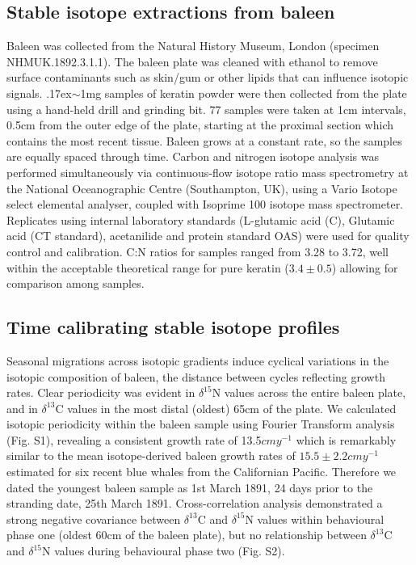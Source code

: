 \documentclass[a4paper,12pt]{article}
\begin{document}
\subsection{Stable isotope extractions from baleen}
Baleen was collected from the Natural History Museum, London (specimen NHMUK.1892.3.1.1). 
The baleen plate was cleaned with ethanol to remove surface contaminants such as skin/gum or other lipids that can influence isotopic signals. 
{\raise.17ex\hbox{$\scriptstyle\sim$}}1mg samples of keratin powder were then collected from the plate using a hand-held drill and grinding bit. 
77%
 samples were taken at 1cm intervals, 0.5cm from the outer edge of the plate, starting at the proximal section which contains the most recent tissue. 
Baleen grows at a constant rate, so the samples are equally spaced through time\cite{best1996stable}. Carbon and nitrogen isotope analysis was performed simultaneously via continuous-flow isotope ratio mass spectrometry at the National Oceanographic Centre (Southampton, UK), using a Vario Isotope select elemental analyser, coupled with Isoprime 100 isotope mass spectrometer. 
Replicates using internal laboratory standards (L-glutamic acid (C), Glutamic acid (CT standard), acetanilide and protein standard OAS) were used for quality control and calibration. 
C:N ratios for samples ranged from 3.28\text{\textperthousand} to 3.72\text{\textperthousand}, well within the acceptable theoretical range for pure keratin ($3.4\pm0.5$) allowing for comparison among samples\cite{hobson1998stable}. 
 
\subsection{Time calibrating stable isotope profiles}
Seasonal migrations across isotopic gradients induce cyclical variations in the isotopic composition of baleen, the distance between cycles reflecting growth rates\cite{hobson1998stable,busquets2017estimating}. 
Clear periodicity was evident in $\delta^{15}$N values across the entire baleen plate, and in $\delta^{13}$C values in the most distal (oldest) 65cm of the plate. 
We calculated isotopic periodicity within the baleen sample using Fourier Transform analysis\cite{cardona2017temporal} (Fig. S1), revealing a consistent growth rate of 13.5$cmy^{-1}$ which is remarkably similar to the mean isotope-derived baleen growth rates of $15.5 \pm 2.2cmy^{-1}$ estimated for six recent blue whales from the Californian Pacific\cite{busquets2017estimating}.  
Therefore we dated the youngest baleen sample as 1st March 1891, 24 days prior to the stranding date, 25th March 1891. 
Cross-correlation analysis demonstrated a strong negative covariance between $\delta^{13}$C and $\delta^{15}$N values within behavioural phase one (oldest 60cm of the baleen plate), but no relationship between $\delta^{13}$C and $\delta^{15}$N values during behavioural phase two (Fig. S2).
 
\end{document}

